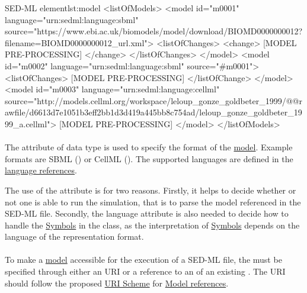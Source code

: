 \begin{myXmlLst}{SED-ML  element}{lst:model}
<listOfModels>
	<model id="m0001" language="urn:sedml:language:sbml" 
		source="https://www.ebi.ac.uk/biomodels/model/download/BIOMD0000000012?filename=BIOMD0000000012_url.xml">
		<listOfChanges>
			<change>
				[MODEL PRE-PROCESSING]
			</change>
		</listOfChanges> 
	</model>
	<model id="m0002" language="urn:sedml:language:sbml" source="#m0001">
		<listOfChanges>
			[MODEL PRE-PROCESSING]
		</listOfChange>
	</model>
	<model id="m0003" language="urn:sedml:language:cellml" source="http://models.cellml.org/workspace/leloup_gonze_goldbeter_1999/@@rawfile/d6613d7e1051b3eff2bb1d3d419a445bb8c754ad/leloup_gonze_goldbeter_1999_a.cellml">
		[MODEL PRE-PROCESSING]
	</model>
</listOfModels>
\end{myXmlLst} 

\paragraph*{}
\label{sec:language}
The   attribute of data type \hyperref[type:anyURI]{} is used to specify the format of the \hyperref[class:model]{model}. Example formats are SBML () or CellML (). The supported languages are defined in the \hyperref[sec:languageURI]{language references}.

The use of the  attribute is  for two reasons. Firstly, it helps to decide whether or not one is able to run the simulation, that is to parse the model referenced in the SED-ML file. Secondly, the language attribute is also needed to decide how to handle the \hyperref[sec:implicitVariable]{Symbols} in the \Variable class, as the interpretation of \hyperref[sec:implicitVariable]{Symbols} depends on the language of the representation format.


\paragraph*{}
\label{sec:model_source}
To make a \hyperref[class:model]{model} accessible for the execution of a SED-ML file, the  must be specified through either an URI or a reference to an  of an existing \Model. The URI should follow the proposed \hyperref[sec:uriScheme]{URI Scheme} for \hyperref[sec:modelURI]{Model references}.

